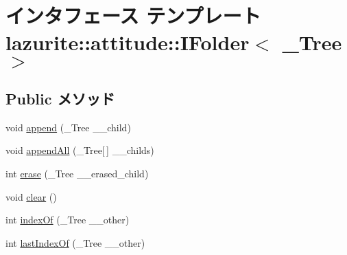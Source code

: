 \hypertarget{interfacelazurite_1_1attitude_1_1_i_folder_3_01___tree_01_4}{
\section{インタフェース テンプレート lazurite::attitude::IFolder$<$ \_\-Tree $>$}
\label{interfacelazurite_1_1attitude_1_1_i_folder_3_01___tree_01_4}
}
\subsection*{Public メソッド}
\begin{DoxyCompactItemize}
\item 
void \hyperlink{interfacelazurite_1_1attitude_1_1_i_folder_3_01___tree_01_4_a677fc98e5b866d84a7a5821adb4dd323}{append} (\_\-Tree \_\-\_\-child)
\item 
void \hyperlink{interfacelazurite_1_1attitude_1_1_i_folder_3_01___tree_01_4_a63afb8adadc9ca974a35b0b68f28eb65}{appendAll} (\_\-Tree\mbox{[}$\,$\mbox{]} \_\-\_\-childs)
\item 
int \hyperlink{interfacelazurite_1_1attitude_1_1_i_folder_3_01___tree_01_4_a0eba789ef4a1d6b3dafc552b12724a62}{erase} (\_\-Tree \_\-\_\-erased\_\-child)
\item 
void \hyperlink{interfacelazurite_1_1attitude_1_1_i_folder_3_01___tree_01_4_ab9a3cc318157678ab67c0e7dc27947e1}{clear} ()
\item 
int \hyperlink{interfacelazurite_1_1attitude_1_1_i_folder_3_01___tree_01_4_ab1db0492dcf23ba9472059dc63cbf636}{indexOf} (\_\-Tree \_\-\_\-other)
\item 
int \hyperlink{interfacelazurite_1_1attitude_1_1_i_folder_3_01___tree_01_4_aa24b999a1c80aab051494a1c668b739e}{lastIndexOf} (\_\-Tree \_\-\_\-other)
\end{DoxyCompactItemize}
